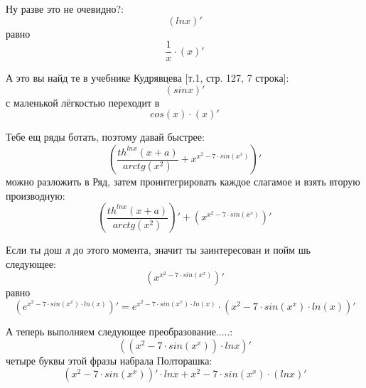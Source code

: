 \documentclass[a4paper, 12pt]{article}
\begin{document}
Ну разве это не очевидно?:
\begin{equation}
\left(lnx \right)'
\end{equation}
равно
\begin{equation}
\frac{1}{x} \cdot \left(x \right)'
\end{equation}

А это вы найд те в учебнике Кудрявцева [т.1, стр. 127, 7 строка]:
\begin{equation}
\left(sinx \right)'
\end{equation}
с маленькой лёгкостью переходит в
\begin{equation}
cos \left( x \right) \cdot \left( x \right)'
\end{equation}

Тебе ещ ряды ботать, поэтому давай быстрее:
\begin{equation}
\left(\frac{th^{lnx}\left(x + a\right)}{arctg\left(x^{2}\right)} + x^{x^{2} - 7 \cdot sin\left(x^{x}\right)} \right)'
\end{equation}
можно разложить в Ряд, затем проинтегрировать каждое слагамое и взять вторую производную:
\begin{equation}
\left( \frac{th^{lnx}\left(x + a\right)}{arctg\left(x^{2}\right)} \right) ' + \left( x^{x^{2} - 7 \cdot sin\left(x^{x}\right)} \right)'
\end{equation}

Если ты дош л до этого момента, значит ты заинтересован и пойм шь следующее:
\begin{equation}
\left(x^{x^{2} - 7 \cdot sin\left(x^{x}\right)} \right)'
\end{equation}
равно
\begin{equation}
\left(e^{x^{2} - 7 \cdot sin\left(x^{x}\right)\cdot ln \left(x \right)}  \right)' = e^{x^{2} - 7 \cdot sin\left(x^{x}\right)\cdot ln \left(x \right)} \cdot \left( x^{2} - 7 \cdot sin\left(x^{x}\right)\cdot ln \left(x \right) \right)'
\end{equation}

А теперь выполняем следующее преобразование.....:
\begin{equation}
\left(\left(x^{2} - 7 \cdot sin\left(x^{x}\right)\right) \cdot lnx \right)'
\end{equation}
четыре буквы этой фразы набрала Полторашка:
\begin{equation}
\left(x^{2} - 7 \cdot sin\left(x^{x}\right) \right)' \cdot lnx + x^{2} - 7 \cdot sin\left(x^{x}\right)\cdot \left( lnx \right)'
\end{equation}
\end{document}
